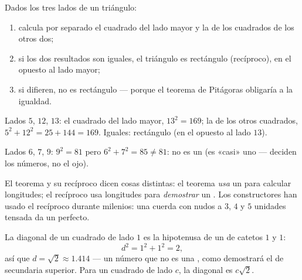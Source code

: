 \begin{method}\label{met:g8:pythagoras:test}
Dados los tres lados de un triángulo:
\begin{enumerate}
  \item calcula por separado el cuadrado del lado mayor y la 
        de los cuadrados de los otros dos;
  \item si los dos resultados son iguales, el triángulo es rectángulo
        (recíproco), en el  opuesto al lado mayor;
  \item si difieren, no es rectángulo --- porque el teorema de
        Pitágoras obligaría a la igualdad.
\end{enumerate}
\end{method}

\begin{example}\label{ex:g8:pythagoras:test}
Lados $5$, $12$, $13$: el cuadrado del lado mayor, $13^2 = 169$; la  de
los otros cuadrados, $5^2 + 12^2 = 25 + 144 = 169$. Iguales: rectángulo
(en el  opuesto al lado $13$).

Lados $6$, $7$, $9$: $9^2 = 81$ pero $6^2 + 7^2 = 85 \neq 81$: no es un
 (es «casi» uno --- deciden los números, no el
ojo).
\end{example}

\begin{remark}
El teorema y su recíproco dicen cosas distintas: el teorema
\emph{usa} un  para calcular longitudes; el recíproco usa
longitudes para \emph{demostrar} un . Los constructores han usado el
recíproco durante milenios: una cuerda con nudos a $3$, $4$ y $5$ unidades
tensada da un  perfecto.
\end{remark}

\begin{example}\label{ex:g8:pythagoras:diagonal}
La diagonal de un cuadrado de lado $1$ es la hipotenusa de un  de catetos $1$ y $1$:
\[
d^2 = 1^2 + 1^2 = 2 ,
\]
así que $d = \sqrt2 \approx 1.414$ --- un número que no es una , como
demostrará el  de secundaria superior. Para un cuadrado de lado $c$, la
diagonal es $c\sqrt2$.
\end{example}

